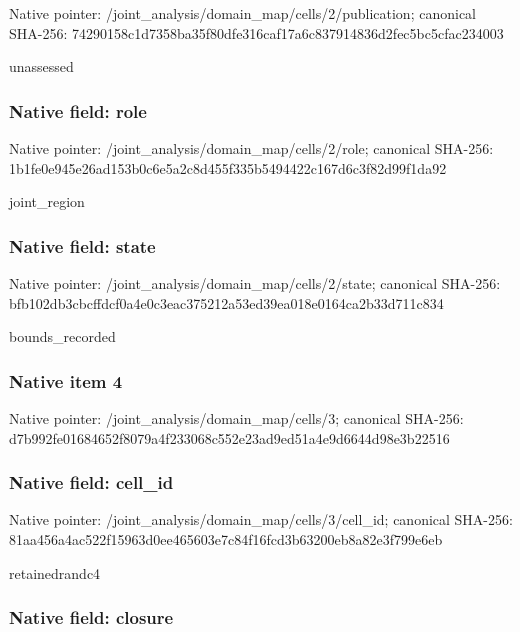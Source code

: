 \documentclass[10pt,a4paper]{article}
\begin{document}
Native pointer: /joint\_analysis/domain\_m\allowbreak{}ap/cells/2/publication; canonical SHA-256: 74290158c1d7358ba35f80df\allowbreak{}e316caf17a6c837914836d2f\allowbreak{}ec5bc5cfac234003


unassessed


\subsubsection{Native field: role}


Native pointer: /joint\_analysis/domain\_map/cells/2/role; canonical SHA-256: 1b1fe0e945e26ad153b0c6e5\allowbreak{}a2c8d455f335b5494422c167\allowbreak{}d6c3f82d99f1da92


joint\_region


\subsubsection{Native field: state}


Native pointer: /joint\_analysis/domain\_m\allowbreak{}ap/cells/2/state; canonical SHA-256: bfb102db3cbcffdcf0a4e0c3\allowbreak{}eac375212a53ed39ea018e01\allowbreak{}64ca2b33d711c834


bounds\_recorded


\subsubsection{Native item 4}


Native pointer: /joint\_analysis/domain\_map/cells/3; canonical SHA-256: d7b992fe01684652f8079a4f\allowbreak{}233068c552e23ad9ed51a4e9\allowbreak{}d6644d98e3b22516



\subsubsection{Native field: cell\_id}


Native pointer: /joint\_analysis/domain\_m\allowbreak{}ap/cells/3/cell\_id; canonical SHA-256: 81aa456a4ac522f15963d0ee\allowbreak{}465603e7c84f16fcd3b63200\allowbreak{}eb8a82e3f799e6eb


retainedrandc4


\subsubsection{Native field: closure}
\end{document}
